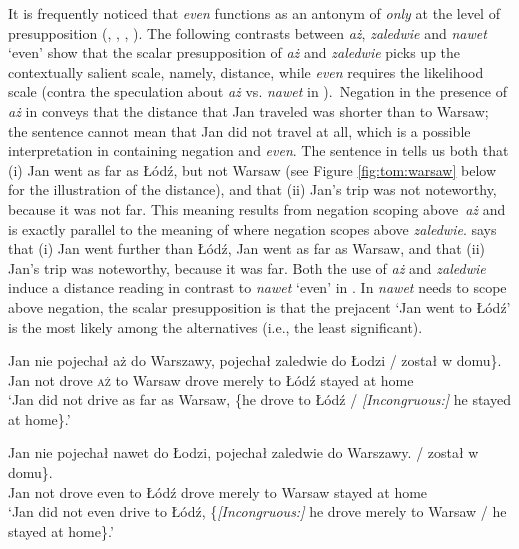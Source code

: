 \documentclass[output=paper,colorlinks,citecolor=brown]{langscibook}
\begin{document}
It is frequently noticed that \textit{even} functions as an antonym of \textit{only} at the level of presupposition (\citealt{horn69}, \citealt{koenig91}, \citealt{beaverclark08}, \citealt{greenberg22}). The following contrasts between \textit{aż}, \textit{zaledwie} and \textit{nawet} `even' show that the scalar presupposition of \textit{aż} and \textit{zaledwie} picks up the contextually salient scale, namely, distance, while \textit{even} requires the likelihood scale (contra the speculation about \textit{aż} vs. \textit{nawet} in \citealt{bajaj16}).~Negation in the presence of \textit{aż} in  conveys that the distance that Jan traveled was shorter than to Warsaw; the sentence cannot mean that Jan did not travel at all, which is a possible interpretation in  containing negation and \textit{even}. The sentence in  tells us both that (i) Jan went as far as Łódź, but not Warsaw (see Figure \ref{fig:tom:warsaw} below for the illustration of the distance), and that (ii) Jan’s trip was not noteworthy, because it was not far. This meaning results from negation scoping above~\textit{aż} and is exactly parallel to the meaning of  where negation scopes above \textit{zaledwie}.  says that (i) Jan went further than Łódź, Jan went as far as Warsaw, and that (ii) Jan’s trip was noteworthy, because it was far. Both the use of \textit{aż} and \textit{zaledwie} induce a distance reading in contrast to \textit{nawet} `even' in . In  \textit{nawet} needs to scope above negation, the scalar presupposition is that the prejacent `Jan went to Łódź' is the most likely among the alternatives (i.e., the least significant).

\ea\label{ex:tom:71}
\gll Jan nie pojechał aż do Warszawy, \minsp{\{} pojechał zaledwie do Łodzi / \minsp{\#} został w domu\}.\\             
Jan not drove \textsc{aż} to Warsaw {} drove merely to Łódź {} {} stayed  at  home\\
\glt `Jan did not drive as far as Warsaw, \{he drove to Łódź / \textit{[Incongruous:]} he stayed at home\}.’
\z 

\ea\label{ex:tom:72}
\gll Jan nie pojechał nawet do Łodzi, \minsp{\{\#} pojechał zaledwie do Warszawy. / został w domu\}. \\                   
Jan not drove even to Łódź {} drove merely to Warsaw {} stayed  at  home\\
\glt `Jan did not even drive to Łódź, \{\textit{[Incongruous:]} he drove merely to Warsaw / he stayed at home\}.’
\z
\end{document}
